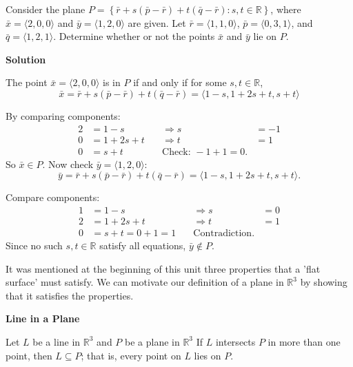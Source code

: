 \begin{examplebox}
Consider the plane \( P = \left\{ \bar{r} + s(\bar{p} - \bar{r}) + t(\bar{q} - \bar{r}) : s, t \in \mathbb{R} \right\} \), where
\( \bar{x} = \langle 2, 0, 0 \rangle \) and \( \bar{y} = \langle 1, 2, 0 \rangle \) are given. Let \( \bar{r} = \langle 1, 1, 0 \rangle \), \( \bar{p} = \langle 0, 3, 1 \rangle \), and \( \bar{q} = \langle 1, 2, 1 \rangle \). Determine whether or not the points \( \bar{x} \) and \( \bar{y} \) lie on \( P \).

\vspace{0.5em}

\textbf{Solution}

\vspace{0.5em}

The point \( \bar{x} = \langle 2, 0, 0 \rangle \) is in \( P \) if and only if for some \( s, t \in \mathbb{R} \),
\[
\bar{x} = \bar{r} + s(\bar{p} - \bar{r}) + t(\bar{q} - \bar{r}) = \langle 1 - s, 1 + 2s + t, s + t \rangle
\]


By comparing components:
\[
\begin{aligned}
2 &= 1 - s \quad &\Rightarrow s &= -1 \\
0 &= 1 + 2s + t \quad &\Rightarrow t &= 1 \\
0 &= s + t \quad &\text{Check: } -1 + 1 = 0.
\end{aligned}
\]
So \( \bar{x} \in P \). Now check \( \bar{y} = \langle 1, 2, 0 \rangle \):
\[
\bar{y} = \bar{r} + s(\bar{p} - \bar{r}) + t(\bar{q} - \bar{r}) = \langle 1 - s, 1 + 2s + t, s + t \rangle.
\]

Compare components:
\[
\begin{aligned}
1 &= 1 - s \quad &\Rightarrow s &= 0 \\
2 &= 1 + 2s + t \quad &\Rightarrow t &= 1 \\
0 &= s + t = 0 + 1 = 1 \quad &\text{Contradiction}.
\end{aligned}
\]
Since no such \( s, t \in \mathbb{R} \) satisfy all equations, \( \bar{y} \notin P \).
\end{examplebox}

\newpage

It was mentioned at the beginning of this unit three properties that a 'flat surface' must satisfy.
We can motivate our definition of a plane in \(\mathbb{R}^3\) by showing that it satisfies the properties.

\begin{theorembox}
    \textbf{Line in a Plane}

    Let \(L\) be a line in \(\mathbb{R}^3\) and \(P\) be a plane in \(\mathbb{R}^3\) If \(L\) intersects \(P\) in more than one point,
    then \(L \subseteq P\); that is, every point on \(L\) lies on \(P\).
\end{theorembox}

